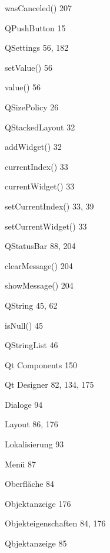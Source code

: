 \documentclass{book}
\renewcommand\subitem{\par}
\begin{document}
\begin{multicols}{2}
\begin{osp-index}
    \subitem wasCanceled()\hspace{1mm} 207
  \item QPushButton\hspace{1mm} 15
  \item QSettings\hspace{1mm} 56, 182
    \subitem setValue()\hspace{1mm} 56
    \subitem value()\hspace{1mm} 56
  \item QSizePolicy\hspace{1mm} 26
  \item QStackedLayout\hspace{1mm} 32
    \subitem addWidget()\hspace{1mm} 32
    \subitem currentIndex()\hspace{1mm} 33
    \subitem currentWidget()\hspace{1mm} 33
    \subitem setCurrentIndex()\hspace{1mm} 33, 39
    \subitem setCurrentWidget()\hspace{1mm} 33
  \item QStatusBar\hspace{1mm} 88, 204
    \subitem clearMessage()\hspace{1mm} 204
    \subitem showMessage()\hspace{1mm} 204
  \item QString\hspace{1mm} 45, 62
    \subitem isNull()\hspace{1mm} 45
  \item QStringList\hspace{1mm} 46
  \item Qt Components\hspace{1mm} 150
  \item Qt Designer\hspace{1mm} 82, 134, 175
    \subitem Dialoge\hspace{1mm} 94
    \subitem Layout\hspace{1mm} 86, 176
    \subitem Lokalisierung\hspace{1mm} 93
    \subitem Men\"u\hspace{1mm} 87
    \subitem Oberfl\"ache\hspace{1mm} 84
    \subitem Objektanzeige\hspace{1mm} 176
    \subitem Objekteigenschaften\hspace{1mm} 84, 176
    \subitem Qbjektanzeige\hspace{1mm} 85

\end{osp-index}
\end{multicols}
\end{document}
